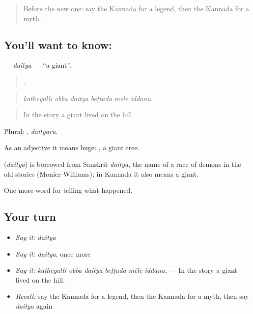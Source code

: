 \label{lesson:KA-C340-daitya}



\begin{quote}
Before the new one: say the Kannada for a legend, then the Kannada for a myth.
\end{quote}

\subsection*{You'll want to know: }
\textbf{} — \emph{daitya} — \textquotedblleft{}a giant\textquotedblright{}.

\begin{quote}
     .
\end{quote}

\begin{quote}
\emph{katheyalli obba daitya beṭṭada mēle iddanu.}
\end{quote}

\begin{quote}
In the story a giant lived on the hill.
\end{quote}

Plural: , \emph{daityaru}.

As an adjective it means huge:  , a giant tree.

\begin{cousinweb}
\textbf{} (\emph{daitya}) is borrowed from Sanskrit \emph{daitya}, the name of a race of demons in the old stories (Monier-Williams); in Kannada it also means a giant.
\end{cousinweb}

\begin{grammarlens}[title={What you've built}]
One more word for telling what happened.
\end{grammarlens}

\subsection*{Your turn}
\begin{itemize}
\raggedright
  \item \emph{Say it:} \emph{daitya}
  \item \emph{Say it:} \emph{daitya}, once more
  \item \emph{Say it:} \emph{katheyalli obba daitya beṭṭada mēle iddanu.} — In the story a giant lived on the hill.
  \item \emph{Recall:} say the Kannada for a legend, then the Kannada for a myth, then say \emph{daitya} again
\end{itemize}

